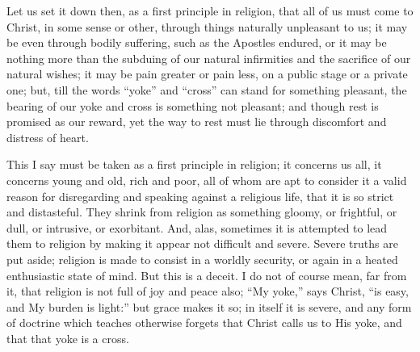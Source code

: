 Let us set it down then, as a first principle in religion, that all
of us must come to Christ, in some sense or other, through things
naturally unpleasant to us; it may be even through bodily suffering,
such as the Apostles endured, or it may be nothing more than the
subduing of our natural infirmities and the sacrifice of our natural
wishes; it may be pain greater or pain less, on a public stage or a
private one; but, till the words ``yoke'' and
``cross'' can stand for something pleasant, the bearing of our
yoke and cross is something not pleasant; and though rest is promised
as our reward, yet the way to rest must lie through discomfort and
distress of heart.

This I say must be taken as a first principle in religion; it
concerns us all, it concerns young and old, rich and poor, all of whom
are apt to consider it a valid reason for disregarding and speaking
against a religious life, that it is so strict and distasteful. They
shrink from religion as something gloomy, or frightful, or dull, or
intrusive, or exorbitant. And, alas, sometimes it is attempted to lead
them to religion by making it appear not difficult and severe. Severe
truths are put aside; religion is made to consist in a worldly
security, or again in a heated enthusiastic state of mind. But this is
a deceit. I do not of course mean, far from it, that religion is not
full of joy and peace also; ``My yoke,'' says Christ, ``is
easy, and My burden is light:'' but grace makes it so; in itself
it is severe, and any form of doctrine which teaches otherwise forgets
that Christ calls us to His yoke, and that that yoke is a cross.

